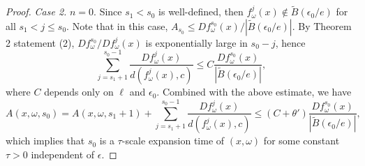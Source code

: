 \documentclass[10pt,a4paper]{amsart}
\begin{document}
\begin{proof}
{\it Case 2.} $n =0$. Since $s_1 < s_0$ is well-defined, then $f_{\omega}^j(x) \notin \tilde B(\epsilon_0/e)$ for all $s_1 < j \leq s_0$. Note that in this case, $A_{s_0} \leq Df_{\omega}^{s_0} (x) / |\tilde B(\epsilon_0/e)|$. By Theorem 2 statement (2), $Df_{\omega}^{s_0} / Df_{\omega}^j (x)$ is exponentially large in $s_0 -j$, hence 
\[
\sum_{j = s_1 +1}^{s_0 -1}  \frac{D f_{\omega}^j(x)}{ d(f_{\omega}^j(x), c)} \leq C  \frac{D f_{\omega}^{s_0}(x)}{ |\tilde B(\epsilon_0/e)|},
\]
where $C$ depends only on $\ell$ and $\epsilon_0$. Combined with the above estimate, we have 
\[
A(x, \omega, s_0) = A(x, \omega, s_1 + 1) +  \sum_{j = s_1 +1}^{s_0 -1}  \frac{D f_{\omega}^j(x)}{ d(f_{\omega}^j(x), c)} \leq (C + \theta') \frac{Df_{\omega}^{s_0} (x)}{ |\tilde B(\epsilon_0/e)|},
\]
which implies that $s_0$ is a $\tau$-scale expansion time of $(x, \omega)$ for some constant $\tau > 0$ independent of $\epsilon$.

\end{proof}
\end{document}
